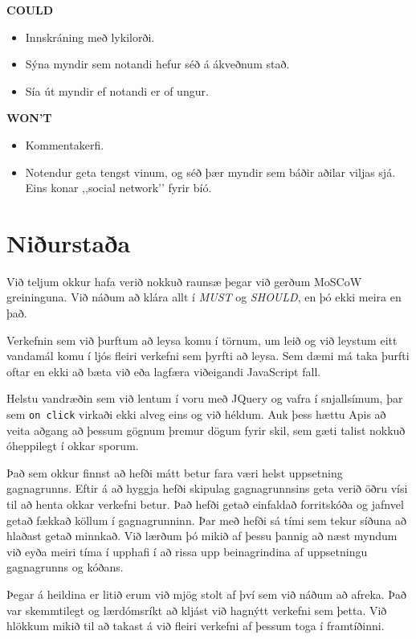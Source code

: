 \documentclass[a4paper,oneside]{article}
\begin{document}
\noindent\textbf{COULD}
\begin{itemize}
    \item Innskráning með lykilorði.
    \item Sýna myndir sem notandi hefur séð á ákveðnum stað.
    \item Sía út myndir ef notandi er of ungur.
\end{itemize}

\noindent\textbf{WON'T}
\begin{itemize}
    \item Kommentakerfi.
    \item Notendur geta tengst vinum, og séð þær myndir sem báðir aðilar viljas sjá.
        Eins konar ,,social network’’ fyrir bíó.
\end{itemize}

\section{Niðurstaða}
Við teljum okkur hafa verið nokkuð raunsæ þegar við gerðum MoSCoW greininguna. 
Við náðum að klára allt í \emph{MUST} og \emph{SHOULD}, en þó ekki meira en það. 

Verkefnin sem við þurftum að leysa komu í törnum, um leið og við leystum
eitt vandamál komu í ljós fleiri verkefni sem þyrfti að leysa.
Sem dæmi má taka þurfti oftar en ekki að bæta við eða lagfæra viðeigandi JavaScript fall.

Helstu vandræðin sem við lentum í voru með JQuery og vafra í snjallsímum, þar sem
\texttt{on click} virkaði ekki alveg eins og við héldum. Auk þess hættu Apis að 
veita aðgang að þessum gögnum þremur dögum fyrir skil, sem gæti talist nokkuð óheppilegt
í okkar sporum. 

Það sem okkur finnst að hefði mátt betur fara væri helst uppsetning gagnagrunns. Eftir á
að hyggja hefði skipulag gagnagrunnsins geta verið öðru vísi til að henta okkar verkefni 
betur. Það hefði getað einfaldað forritskóða og jafnvel getað fækkað köllum í gagnagrunninn.
Þar með hefði sá tími sem tekur síðuna að hlaðast getað minnkað. Við lærðum þó mikið af þessu 
þannig að næst myndum við eyða meiri tíma í upphafi í að rissa upp beinagrindina af uppsetningu 
gagnagrunns og kóðans.

Þegar á heildina er litið erum við mjög stolt af því sem við náðum að afreka. Það var skemmtilegt 
og lærdómsríkt að kljást við hagnýtt verkefni sem þetta. Við hlökkum mikið til að takast á við fleiri
verkefni af þessum toga í framtíðinni.
\end{document}
